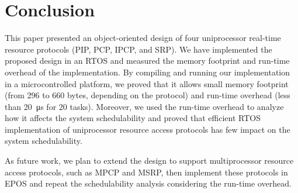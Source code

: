 \section{Conclusion}
\label{sec:conc}

This paper presented an object-oriented design of four uniprocessor real-time 
resource protocols (PIP, PCP, IPCP, and SRP). We have implemented the proposed 
design in an RTOS and measured the memory footprint and run-time overhead of 
the implementation. By compiling and running our implementation in a 
microcontrolled platform, we proved that it allows small memory footprint (from 
296 to 660 bytes, depending on the protocol) and run-time overhead (less than 
20~\si{\micro\second} for 20 tasks). Moreover, we used the run-time overhead to 
analyze how it affects the system schedulability and proved that efficient 
RTOS implementation of uniprocessor resource access protocols has few impact on 
the system schedulability. 

As future work, we plan to extend the design to support multiprocessor 
resource access protocols, such as MPCP and MSRP, then implement these 
protocols in EPOS and repeat the schedulability analysis considering the 
run-time overhead.
